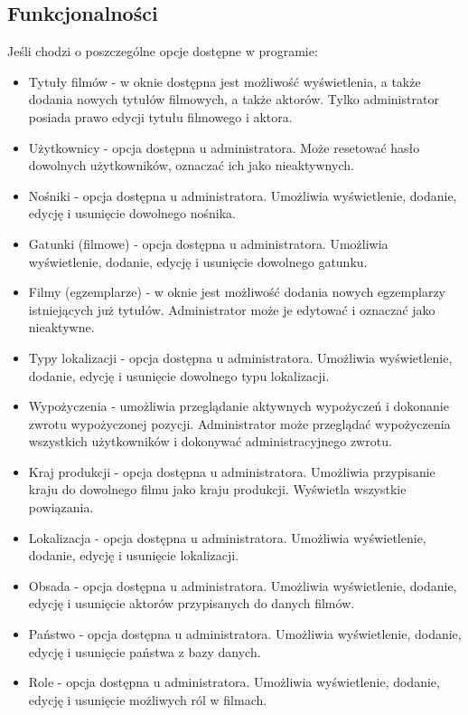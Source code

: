 \documentclass{article}
\begin{document}
\subsection{Funkcjonalności}
Jeśli chodzi o poszczególne opcje dostępne w programie:
\begin{itemize}
\item Tytuły filmów - w oknie dostępna jest możliwość wyświetlenia, a także dodania nowych tytułów filmowych, a także aktorów. Tylko administrator posiada prawo edycji tytułu filmowego i aktora.
\item Użytkownicy - opcja dostępna u administratora. Może resetować hasło dowolnych użytkowników, oznaczać ich jako nieaktywnych.
\item Nośniki - opcja dostępna u administratora. Umożliwia wyświetlenie, dodanie, edycję i usunięcie dowolnego nośnika.
\item Gatunki (filmowe) - opcja dostępna u administratora. Umożliwia wyświetlenie, dodanie, edycję i usunięcie dowolnego gatunku.
\item Filmy (egzemplarze) - w oknie jest możliwość dodania nowych egzemplarzy istniejących już tytułów. Administrator może je edytować i oznaczać jako nieaktywne.
\item Typy lokalizacji - opcja dostępna u administratora. Umożliwia wyświetlenie, dodanie, edycję i usunięcie dowolnego typu lokalizacji.
\item Wypożyczenia - umożliwia przeglądanie aktywnych wypożyczeń i dokonanie zwrotu wypożyczonej pozycji. Administrator może przeglądać wypożyczenia wszystkich użytkowników i dokonywać administracyjnego zwrotu.
\item Kraj produkcji - opcja dostępna u administratora. Umożliwia przypisanie kraju do dowolnego filmu jako kraju produkcji. Wyświetla wszystkie powiązania.
\item Lokalizacja - opcja dostępna u administratora. Umożliwia wyświetlenie, dodanie, edycję i usunięcie lokalizacji. 
\item Obsada - opcja dostępna u administratora. Umożliwia wyświetlenie, dodanie, edycję i usunięcie aktorów przypisanych do danych filmów.
\item Państwo - opcja dostępna u administratora. Umożliwia wyświetlenie, dodanie, edycję i usunięcie państwa z bazy danych.
\item Role - opcja dostępna u administratora. Umożliwia wyświetlenie, dodanie, edycję i usunięcie możliwych ról w filmach.
\end{itemize}
\end{document}
